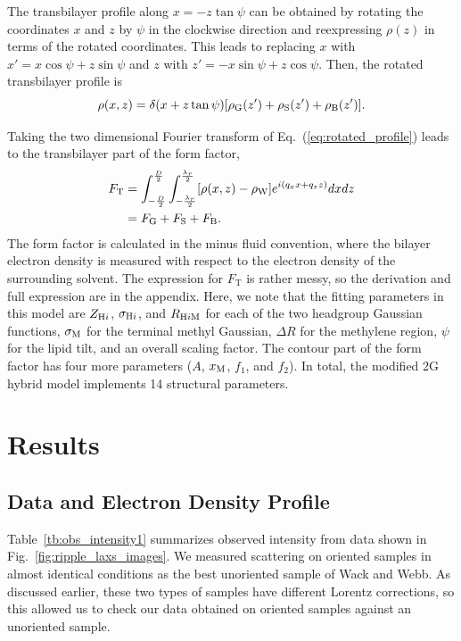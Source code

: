 The transbilayer profile along $x=-z\tan\psi$ can be obtained by rotating
the coordinates $x$ and $z$ by $\psi$ in the clockwise direction and
reexpressing $\rho(z)$ in terms of the rotated coordinates. This leads
to replacing $x$ with $x'=x\cos\psi+z\sin\psi$ and
$z$ with $z'=-x\sin\psi+z\cos\psi$. Then, the rotated transbilayer profile is
\begin{equation}
  \rho(x,z) = \delta(x+z\tan\psi)\mathopen{}\left[ \rho_\mathrm{G}(z') + \rho_\mathrm{S}(z') + \rho_\mathrm{B}(z') \right]\mathclose{}.
  \label{eq:rotated_profile}
\end{equation}

Taking the two dimensional Fourier transform of Eq.~(\ref{eq:rotated_profile})
leads to the transbilayer part of the form factor,
\begin{align}
  F_\mathrm{T} 
  &= \int_{-\frac{D}{2}}^{\frac{D}{2}} \int_{-\frac{\lambda_r}{2}}^{\frac{\lambda_r}{2}} 
     \mathopen{}\left[ \rho(x,z)-\rho_\mathrm{W} \right]\mathclose{} e^{i(q_xx+q_zz)} dxdz \\
  &= F_\mathrm{G} + F_\mathrm{S} + F_\mathrm{B}.
\end{align}
The form factor is calculated in the minus fluid convention, 
where the bilayer electron density
is measured with respect to the electron density of the surrounding solvent.
The expression for $F_\mathrm{T}$ is rather messy, so 
the derivation and full expression are in the appendix. Here, 
we note that
the fitting parameters in this model are $Z_{\mathrm{H}i}$, $\sigma_{\mathrm{H}i}$, and 
$R_{\mathrm{H}i\mathrm{M}}$ for each of the two headgroup Gaussian functions, $\sigma_\mathrm{M}$ for
the terminal methyl Gaussian, $\Delta R$ for the methylene region, $\psi$ for
the lipid tilt, and an overall scaling factor. The contour part of the 
form factor has four more parameters ($A$, $x_\textrm{M}$, $f_1$, and $f_2$).
In total, the modified 2G hybrid model implements 14 structural parameters.


\section{Results}
\subsection{Data and Electron Density Profile}\label{sec:LAXS}
Table~\ref{tb:obs_intensity1} summarizes observed intensity from data shown
in Fig.~\ref{fig:ripple_laxs_images}. 
We measured scattering on oriented samples in almost identical conditions as the
best unoriented sample of Wack and Webb. As discussed earlier,
these two types of samples have different Lorentz corrections, so 
this allowed us to check our data obtained on 
oriented samples against an unoriented sample. 

